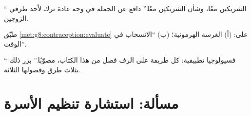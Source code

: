 \begin{exercise}[$\star\star$]\label{exo:g8:contraception:10}
`` الشريكين معًا، وشأن الشريكين معًا.'' دافع عن
الجملة في وجه عادة ترك  لأحد طرفي الزوجين.
\end{exercise}

\begin{exercise}[$\star\star$]\label{exo:g8:contraception:11}
طبّق \cref{met:g8:contraception:evaluate} على: (أ)
الغرسة الهرمونية؛ (ب) ``الانسحاب في الوقت''.
\end{exercise}

\begin{exercise}[$\star\star\star$]\label{exo:g8:contraception:12}
`` فسيولوجيا تطبيقية: كل طريقة على الرف فصل من
هذا الكتاب، مصوّبًا.'' برر ذلك بثلاث طرق وفصولها
الثلاثة.
\end{exercise}

\section{مسألة: استشارة تنظيم الأسرة}

